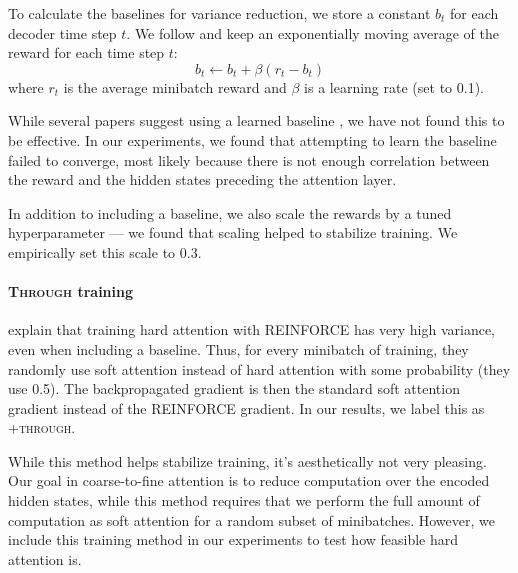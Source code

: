 \documentclass[12pt]{report}
\begin{document}
To calculate the baselines for variance reduction, we store a constant $b_t$ for each decoder time step $t$. We follow \citet{xu2015captioning} and keep an exponentially moving average of the reward for each time step $t$:
\begin{equation}
b_t \gets b_t + \beta (r_t - b_t)
\end{equation}
where $r_t$ is the average minibatch reward and $\beta$ is a learning rate (set to 0.1).

While several papers suggest using a learned baseline \citep[e.g.][]{mnih2014visualattention, ranzato2015}, we have not found this to be effective. In our experiments, we found that attempting to learn the baseline failed to converge, most likely because there is not enough correlation between the reward and the hidden states preceding the attention layer.

In addition to including a baseline, we also scale the rewards by a tuned hyperparameter --- we found that scaling helped to stabilize training. We empirically set this scale to 0.3.






\paragraph{\textsc{Through} training} \citet{xu2015captioning} explain that training hard attention with REINFORCE has very high variance, even when including a baseline. Thus, for every minibatch of training, they randomly use soft attention instead of hard attention with some probability (they use 0.5).
The backpropagated gradient is then the standard soft attention gradient instead of the REINFORCE gradient. In our results, we label this as \textsc{+through}.

While this method helps stabilize training, it's aesthetically not very pleasing. Our goal in coarse-to-fine attention is to reduce computation over the encoded hidden states, while this method requires that we perform the full amount of computation as soft attention for a random subset of minibatches. However, we include this training method in our experiments to test how feasible hard attention is.
\end{document}
